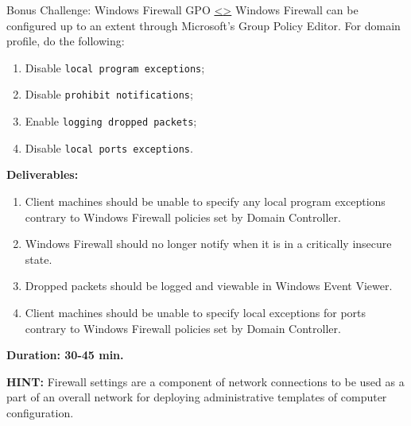 \documentclass[12pt]{extarticle}
\newenvironment{instructionblock}{\Large\bgroup}{\egroup}
\newcommand{\ben}{\begin{enumerate}}
\newcommand{\een}{\end{enumerate}}
\begin{document}
\pagebreak
\begin{slide}{ Bonus Challenge: Windows Firewall GPO }{ \hyperref[slide 24]{\textless}\hyperref[slide 26]{\textgreater} }
\vskip 5pt
\begin{instructionblock}
	Windows Firewall can be configured up to an extent through Microsoft's Group Policy Editor. For domain profile, do the following:
	\begin{enumerate}
	\item Disable \texttt{local program exceptions};
	\item Disable \texttt{prohibit notifications};
	\item Enable \texttt{logging dropped packets};
	\item Disable \texttt{local ports exceptions}.
	\end{enumerate}

\end{instructionblock}

\textbf{\Large{Deliverables:}}
\ben
\item Client machines should be unable to specify any local program exceptions contrary to Windows Firewall policies set by Domain Controller.
\item Windows Firewall should no longer notify when it is in a critically insecure state.
\item Dropped packets should be logged and viewable in Windows Event Viewer.
\item Client machines should be unable to specify local exceptions for ports contrary to Windows Firewall policies set by Domain Controller.
\een

\vspace{20mm}
\begin{center}
	\textbf{\Large{Duration: 30-45 min.} }
\end{center}

\end{slide}


\vspace{8mm}
\noindent
\textbf{HINT:} Firewall settings are a component of network connections to be used as a part of an overall network for deploying administrative templates of computer configuration.


\end{document}
